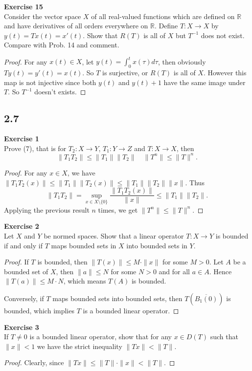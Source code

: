 \documentclass[12pt, a4paper]{article}
\theoremstyle{plain}
\newcommand{\R}{\mathbb{R}}
\newenvironment{exercise}[2][Exercise]
    { \begin{mdframed}[backgroundcolor=gray!20] \textbf{#1 #2} \\}
    {  \end{mdframed}}
\begin{document}
\begin{exercise}{15}
Consider the vector space $X$ of all real-valued functions which are defined on $\R$ and have derivatives of all orders everywhere on $\R$. Define $T:X\rightarrow X$ by $y(t) = Tx(t) = x'(t)$. Show that $R(T)$ is all of $X$ but $T^{-1}$ does not exist. Compare with Prob. 14 and comment.
\end{exercise}
	\begin{proof}
	For any $x(t)\in X$, let $y(t) = \int_{0}^{t}{x(\tau)d\tau}$, then obviously $Ty(t) = y'(t) = x(t)$. So $T$ is surjective, or $R(T)$ is all of $X$. However this map is not injective since both $y(t)$ and $y(t)+1$ have the same image under $T$. So $T^{-1}$ doesn't exists.
	\end{proof}

\subsection*{2.7}

\begin{exercise}{1}
Prove (7), that is for $T_2:X\rightarrow Y$, $T_1:Y\rightarrow Z$ and $T:X\rightarrow X$, then
\[
\|T_1T_2\|\leq \|T_1\|\|T_2\|\quad \|T^n\|\leq \|T\|^n.
\]
\end{exercise}
	\begin{proof}
	For any $x\in X$, we have $\|T_1T_2(x)\|\leq \|T_1\|\|T_2(x)\|\leq \|T_1\|\|T_2\|\|x\|$. Thus 
	\[
	\|T_1T_2\| = \sup_{x\in X\setminus\{0\}}\frac{\|T_1T_2(x)\|}{\|x\|}\leq\|T_1\|\|T_2\|.
	\]
	Applying the previous result $n$ times, we get $\|T^n\|\leq \|T\|^n$.
	\end{proof}
	
\begin{exercise}{2}
Let $X$ and $Y$ be normed spaces. Show that a linear operator $T:X\rightarrow Y$ is bounded if and only if $T$ maps bounded sets in $X$ into bounded sets in $Y$.
\end{exercise}
	\begin{proof}
	If $T$ is bounded, then $\|T(x)\|\leq M\cdot \|x\|$ for some $M>0$. Let $A$ be a bounded set of $X$, then $\|a\| \leq N$ for some $N>0$ and for all $a\in A$. Hence $\|T(a)\|\leq M\cdot N$, which means $T(A)$ is bounded.
	
	Conversely, if $T$ maps bounded sets into bounded sets, then $T(\overline{B_1(0)})$ is bounded, which implies $T$ is a bounded linear operator.
	\end{proof}

\begin{exercise}{3}
If $T\neq 0$ is a bounded linear operator, show that for any $x\in D(T)$ such that $\|x\|<1$ we have the strict inequality $\|Tx\|<\|T\|$.
\end{exercise}
	\begin{proof}
	Clearly, since $\|Tx\|\leq \|T\|\cdot\|x\| < \|T\|$.
	\end{proof}
\end{document}
